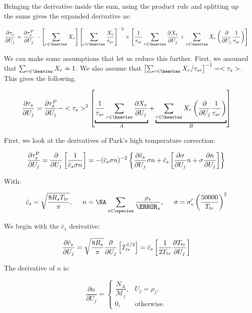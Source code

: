 \documentclass[10pt]{article}
\begin{document}
\begin{flushleft}
Bringing the derivative inside the sum, using the product rule and splitting up the sums gives the expanded derivative as:

\begin{equation}
    \pd{\tau_s}{U_j} = \pd{\tau_s^P}{U_j} - \bb{\sum_{r \in \heavies} X_r} \bb{\sum_{r \in \heavies} \frac{X_r}{\tau_{sr}}}^{-2} \times \bb{ \frac{1}{\tau_{sr}} \sum_{r \in \heavies} \pd{X_r}{U_j}  + \sum_{r \in \heavies} X_r \bp{\pd{}{U_j} \frac{1}{\tau_{sr}}}}
\end{equation}

We can make some assumptions that let us reduce this further. First, we assumed that $\sum_{r \in \heavies} X_r = 1$. We also assume that $\bb{\sum_{r \in \heavies} X_r / \tau_{sr}}^{-1} = <\tau_s>$. This gives the following.

\begin{equation}
    \label{eq:red_dtaus}
    \pd{\tau_s}{U_j} = \pd{\tau_s^P}{U_j} - <\tau_s>^2 \bb{ \ub{\frac{1}{\tau_{sr}} \sum_{r \in \heavies} \pd{X_r}{U_j}}{A} + \ub{\sum_{r \in \heavies} X_r \bp{\pd{}{U_j} \frac{1}{\tau_{sr}}}}{B}}
\end{equation}

First, we look at the derivatives of Park's high temperature correction:

\begin{equation}
    \frac{\partial \tau_{s}^\text{P}}{\partial U_j} = \frac{\partial }{\partial U_j} \left[ \frac{1}{\bar{c}_s \sigma n} \right] = -(\bar{c}_s \sigma n)^{-2} \left\{ \frac{\partial \bar{c}_s}{\partial U_j} \sigma n + \bar{c}_s \left[ \frac{\partial \sigma}{\partial U_j} n + \sigma \frac{\partial n}{\partial U_j} \right] \right\}
\end{equation}

With:

\begin{equation}
    \bar{c}_s = \sqrt{\frac{8 R_s T_{tr}}{\pi}}, \hspace{5mm} n = \NA \sum_{s \in \species} \frac{\rho_s}{\MW_s}, \hspace{5mm} \sigma = \sigma_v' \bp{\frac{50000}{T_{tr}}}^2
\end{equation}

We begin with the $\bar{c}_s$ derivative:

\begin{equation}
    \frac{\partial \bar{c}_s}{\partial U_j} = \sqrt{\frac{8  R_s}{\pi}} \frac{\partial }{\partial U_j} \left[ T_{tr}^{1/2} \right] = \bar{c}_s \left[ \frac{1}{2T_{tr}} \frac{\partial T_{tr}}{\partial U_j} \right]
\end{equation}

The derivative of $n$ is:

\begin{equation}
\frac{\partial n}{\partial U_j} = \begin{cases} \dfrac{N_A}{\mathcal{M}_j}, & U_j = \rho_j, 
    \\[8pt] 0, & \text{otherwise.}
\end{cases}
\end{equation}


\end{flushleft}
\end{document}
